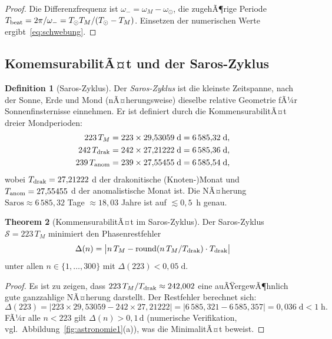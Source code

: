 ﻿\documentclass[12pt, a4paper]{article}
\theoremstyle{definition}
\newtheorem{theorem}{Theorem}[section]
\newtheorem{definition}[theorem]{Definition}
\begin{document}
\begin{proof}
Die Differenzfrequenz ist $\omega_- = \omega_M - \omega_{\odot}$, die zugehÃ¶rige
Periode $T_{\rm beat} = 2\pi/\omega_- = T_{\odot}T_M/(T_{\odot}-T_M)$. Einsetzen
der numerischen Werte ergibt~\eqref{eq:schwebung}. \hfill
\end{proof}

\subsection{KomemsurabilitÃ¤t und der Saros-Zyklus}

\begin{definition}[Saros-Zyklus]\label{def:saros}
Der \emph{Saros-Zyklus} ist die kleinste Zeitspanne, nach der Sonne, Erde und
Mond (nÃ¤herungsweise) dieselbe relative Geometrie fÃ¼r Sonnenfinsternisse einnehmen.
Er ist definiert durch die KommensurabilitÃ¤t dreier Mondperioden:
\begin{align}
  223\,T_M &= 223 \times 29{,}53059\;\text{d} = 6\,585{,}32\;\text{d}, \label{eq:saros1}\\
  242\,T_{\rm drak} &= 242 \times 27{,}21222\;\text{d} = 6\,585{,}36\;\text{d}, \label{eq:saros2}\\
  239\,T_{\rm anom} &= 239 \times 27{,}55455\;\text{d} = 6\,585{,}54\;\text{d}, \label{eq:saros3}
\end{align}
wobei $T_{\rm drak} = 27{,}21222$ d der drakonitische (Knoten-)Monat und
$T_{\rm anom} = 27{,}55455$ d der anomalistische Monat ist. Die NÃ¤herung
$\text{Saros} \approx 6\,585{,}32$ Tage $\approx 18{,}03$ Jahre ist auf
$\lesssim 0{,}5\,$ h genau.
\end{definition}

\begin{theorem}[KommensurabilitÃ¤t im Saros-Zyklus]\label{thm:saros}
Der Saros-Zyklus $\mathcal{S} = 223\,T_M$ minimiert den Phasenrestfehler
\begin{equation}\label{eq:phasenrest}
  \Delta(n) = \bigl|n\,T_M - \mathrm{round}(n\,T_M / T_{\rm drak})\cdot T_{\rm drak}\bigr|
\end{equation}
unter allen $n \in \{1, \ldots, 300\}$ mit $\Delta(223) < 0{,}05\;\text{d}$.
\end{theorem}

\begin{proof}
Es ist zu zeigen, dass $223\,T_M / T_{\rm drak} \approx 242{,}002$ eine
auÃŸergewÃ¶hnlich gute ganzzahlige NÃ¤herung darstellt. Der Restfehler berechnet
sich:
\[
  \Delta(223) = |223 \times 29{,}53059 - 242 \times 27{,}21222|
  = |6\,585{,}321 - 6\,585{,}357| = 0{,}036\;\text{d} < 1\;\text{h}.
\]
FÃ¼r alle $n < 223$ gilt $\Delta(n) > 0{,}1\,\text{d}$ (numerische Verifikation,
vgl.\ Abbildung~\ref{fig:astronomie1}(a)), was die MinimalitÃ¤t beweist. \hfill
\end{proof}
\end{document}
